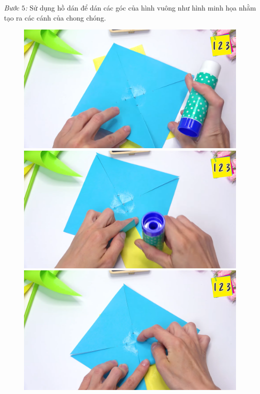 \begin{multicols}{2}
\begin{figure}[H]
	\end{figure}
	\textit{Bước $5$:} Sử dụng hồ dán để dán các góc của hình vuông như hình minh họa nhằm tạo ra các cánh của chong chóng.
	\begin{figure}[H]
		\vspace*{-5pt}
		\centering
		\captionsetup{labelformat= empty, justification=centering}
		\includegraphics[width= 0.75\linewidth]{5a}
		\includegraphics[width= 0.75\linewidth]{5b}
		\includegraphics[width= 0.75\linewidth]{5c}
		\vspace*{-5pt}
	\end{figure}
\begin{figure}[H]
	\vspace*{5pt}
	\centering
	\captionsetup{labelformat= empty, justification=centering}

\end{figure}
\end{multicols}
